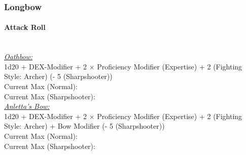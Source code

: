 \documentclass[letterpaper,openany,oneside,twocolumn]{book}
\begin{document}
\subsubsection*{Longbow}
\paragraph*{Attack Roll}\hfill\\
\underline{\textit{Oathbow:}}\\
1d20 + DEX-Modifier + 2 $\times$ Proficiency Modifier (Expertise) + 2 (Fighting Style: Archer) (- 5 (Sharpshooter)) \\
\indent Current Max (Normal):  \\
\indent Current Max (Sharpshooter):  \\
\underline{\textit{Anletta's Bow:}}\\
1d20 + DEX-Modifier + 2 $\times$ Proficiency Modifier (Expertise) + 2 (Fighting Style: Archer) + Bow Modifier (- 5 (Sharpshooter)) \\
\indent Current Max (Normal):  \\
\indent Current Max (Sharpshooter): 
\end{document}
